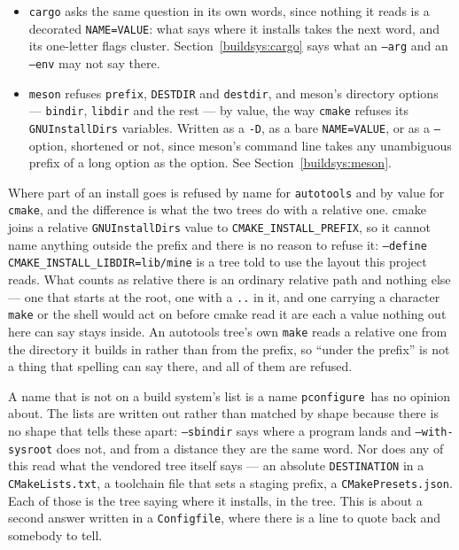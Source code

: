 \documentclass{article}
\newcommand{\pconfigure}{\texttt{pconfigure}}
\begin{document}
\begin{itemize}
\item \texttt{cargo} asks the same question in its own words, since
  nothing it reads is a decorated \texttt{NAME=VALUE}: what says where
  it installs takes the next word, and its one-letter flags cluster.
  Section~\ref{buildsys:cargo} says what an \texttt{--arg} and an
  \texttt{--env} may not say there.

\item \texttt{meson} refuses \texttt{prefix}, \texttt{DESTDIR} and
  \texttt{destdir}, and meson's directory options ---
  \texttt{bindir}, \texttt{libdir} and the rest --- by value, the way
  \texttt{cmake} refuses its \texttt{GNUInstallDirs} variables.
  Written as a \texttt{-D}, as a bare \texttt{NAME=VALUE}, or as a
  \texttt{--} option, shortened or not, since meson's command line
  takes any unambiguous prefix of a long option as the option.  See
  Section~\ref{buildsys:meson}.
\end{itemize}

Where part of an install goes is refused by name for
\texttt{autotools} and by value for \texttt{cmake}, and the difference
is what the two trees do with a relative one.  cmake joins a relative
\texttt{GNUInstallDirs} value to \texttt{CMAKE\_INSTALL\_PREFIX}, so
it cannot name anything outside the prefix and there is no reason to
refuse it: \texttt{--define CMAKE\_INSTALL\_LIBDIR=lib/mine} is a tree
told to use the layout this project reads.  What counts as relative
there is an ordinary relative path and nothing else --- one that
starts at the root, one with a \texttt{..} in it, and one carrying a
character \texttt{make} or the shell would act on before cmake read it
are each a value nothing out here can say stays inside.  An autotools
tree's own \texttt{make} reads a relative one from the directory it
builds in rather than from the prefix, so ``under the prefix'' is not
a thing that spelling can say there, and all of them are refused.

A name that is not on a build system's list is a name \pconfigure\ has
no opinion about.  The lists are written out rather than matched by
shape because there is no shape that tells these apart:
\texttt{--sbindir} says where a program lands and
\texttt{--with-sysroot} does not, and from a distance they are the
same word.  Nor does any of this read what the vendored tree itself
says --- an absolute \texttt{DESTINATION} in a
\texttt{CMakeLists.txt}, a toolchain file that sets a staging prefix,
a \texttt{CMakePresets.json}.  Each of those is the tree saying where
it installs, in the tree.  This is about a second answer written in a
\texttt{Configfile}, where there is a line to quote back and somebody
to tell.
\end{document}
